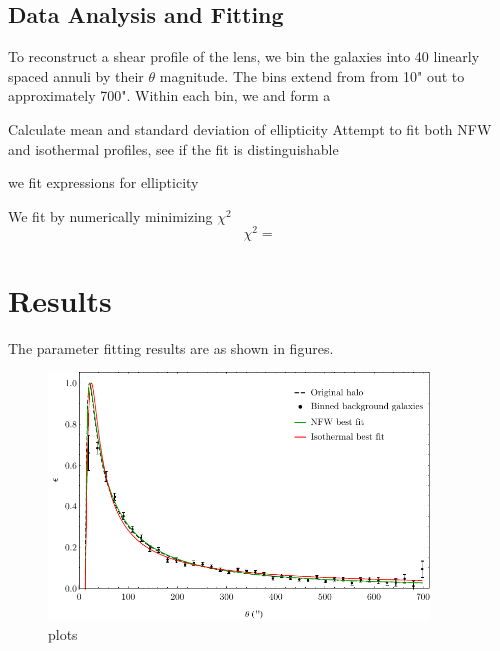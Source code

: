 \documentclass[10pt]{article}
\begin{document}
\subsection{Data Analysis and Fitting}
To reconstruct a shear profile of the lens, we bin the galaxies into 40 linearly spaced annuli by their $\theta$ magnitude. The bins extend from from 10" out to approximately 700". Within each bin, we
and form a

Calculate mean and standard deviation of ellipticity
Attempt to fit both NFW and isothermal profiles, see if the fit is distinguishable


we fit expressions for ellipticity

We fit by numerically minimizing $\chi^2$
\begin{equation}
\chi^2 =
\end{equation}



\section{Results}
The parameter fitting results are as shown in figures.

\begin{figure}
    \centering
    \includegraphics[width=0.9\textwidth]{comparison.pdf}
    \caption{plots}
    \label{}
\end{figure}

\end{document}
